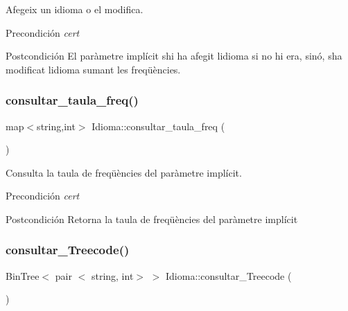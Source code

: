 Afegeix un idioma o el modifica. 

\begin{DoxyPrecond}{Precondición}
{\itshape cert} 
\end{DoxyPrecond}
\begin{DoxyPostcond}{Postcondición}
El paràmetre implícit s\textquotesingle{}hi ha afegit l\textquotesingle{}idioma si no hi era, sinó, s\textquotesingle{}ha modificat l\textquotesingle{}idioma sumant les freqüències. 
\end{DoxyPostcond}
\mbox{\label{class_idioma_a98badc57cda44db5069ac044323b8383}} 
\subsubsection{\texorpdfstring{consultar\+\_\+taula\+\_\+freq()}{consultar\_taula\_freq()}}
{\footnotesize\ttfamily map$<$string,int$>$ Idioma\+::consultar\+\_\+taula\+\_\+freq (\begin{DoxyParamCaption}{ }\end{DoxyParamCaption})}



Consulta la taula de freqüències del paràmetre implícit. 

\begin{DoxyPrecond}{Precondición}
{\itshape cert} 
\end{DoxyPrecond}
\begin{DoxyPostcond}{Postcondición}
Retorna la taula de freqüències del paràmetre implícit 
\end{DoxyPostcond}
\mbox{\label{class_idioma_aca3c9e20f1900ad58ba58fe3112350fe}} 
\subsubsection{\texorpdfstring{consultar\+\_\+\+Treecode()}{consultar\_Treecode()}}
{\footnotesize\ttfamily Bin\+Tree$<$ pair $<$ string, int$>$ $>$ Idioma\+::consultar\+\_\+\+Treecode (\begin{DoxyParamCaption}{ }\end{DoxyParamCaption})}



